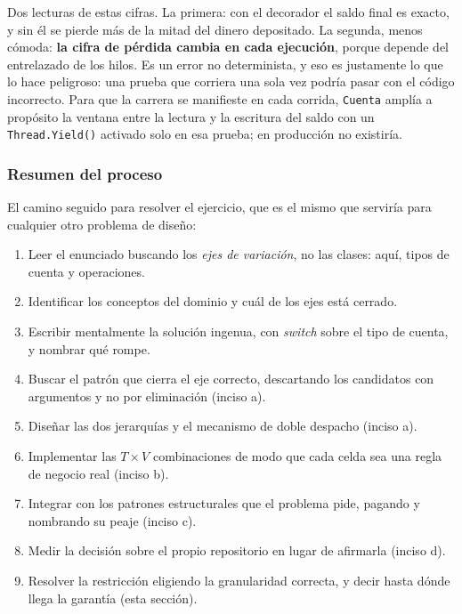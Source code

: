 Dos lecturas de estas cifras. La primera: con el decorador el saldo final es exacto, y sin él
se pierde más de la mitad del dinero depositado. La segunda, menos cómoda: \textbf{la cifra de
pérdida cambia en cada ejecución}, porque depende del entrelazado de los hilos. Es un error no
determinista, y eso es justamente lo que lo hace peligroso: una prueba que corriera una sola
vez podría pasar con el código incorrecto. Para que la carrera se manifieste en cada corrida,
\texttt{Cuenta} amplía a propósito la ventana entre la lectura y la escritura del saldo con un
\texttt{Thread.Yield()} activado solo en esa prueba; en producción no existiría.

\subsubsection*{Resumen del proceso}

El camino seguido para resolver el ejercicio, que es el mismo que serviría para cualquier otro
problema de diseño:

\begin{enumerate}[leftmargin=1.2cm]
    \item Leer el enunciado buscando los \emph{ejes de variación}, no las clases: aquí, tipos
          de cuenta y operaciones.
    \item Identificar los conceptos del dominio y cuál de los ejes está cerrado.
    \item Escribir mentalmente la solución ingenua, con \textit{switch} sobre el tipo de
          cuenta, y nombrar qué rompe.
    \item Buscar el patrón que cierra el eje correcto, descartando los candidatos con
          argumentos y no por eliminación (inciso a).
    \item Diseñar las dos jerarquías y el mecanismo de doble despacho (inciso a).
    \item Implementar las $T \times V$ combinaciones de modo que cada celda sea una regla de
          negocio real (inciso b).
    \item Integrar con los patrones estructurales que el problema pide, pagando y nombrando su
          peaje (inciso c).
    \item Medir la decisión sobre el propio repositorio en lugar de afirmarla (inciso d).
    \item Resolver la restricción eligiendo la granularidad correcta, y decir hasta dónde llega
          la garantía (esta sección).
\end{enumerate}

\fussy
